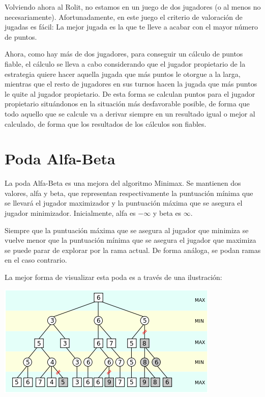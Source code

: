\documentclass[../DocumentoOficial.tex]{subfiles}
\begin{document}
Volviendo ahora al Rolit, no estamos en un juego de dos jugadores (o al menos no necesariamente). Afortunadamente, en este juego el criterio de valoración de jugadas es fácil: La mejor jugada es la que te lleve a acabar con el mayor número de puntos.

Ahora, como hay más de dos jugadores, para conseguir un cálculo de puntos fiable, el cálculo se lleva a cabo considerando que el jugador propietario de la estrategia quiere hacer aquella jugada que más puntos le otorgue a la larga, mientras que el resto de jugadores en sus turnos hacen la jugada que más puntos le quite al jugador propietario. De esta forma se calculan puntos para el jugador propietario situándonos en la situación más desfavorable posible, de forma que todo aquello que se calcule va a derivar siempre en un resultado igual o mejor al calculado, de forma que los resultados de los cálculos son fiables.

\chapter{Poda Alfa-Beta}
\label{ch:AnexoIV}
La poda Alfa-Beta es una mejora del algoritmo Minimax. Se mantienen dos valores, alfa y beta, que representan respectivamente la puntuación mínima que se llevará el jugador maximizador y la puntuación máxima que se asegura el jugador minimizador. Inicialmente, alfa es $-\infty$ y beta es $\infty$. 

Siempre que la puntuación máxima que se asegura al jugador que minimiza se vuelve menor que la puntuación mínima que se asegura el jugador que maximiza se puede parar de explorar por la rama actual. De forma análoga, se podan ramas en el caso contrario.

La mejor forma de visualizar esta poda es a través de una ilustración:

\begin{center}
\includegraphics[scale=0.6]{poda alfa-beta.png}
\end{center}
\end{document}
